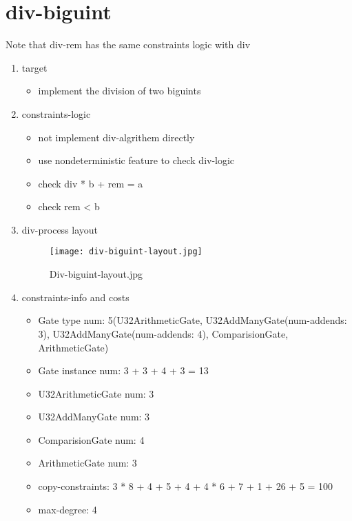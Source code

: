 \section{div-biguint}
\label{div-biguint}

Note that div-rem has the same constraints logic with div

\begin{enumerate}
    \item target
        \begin{itemize}
            \item implement the division of two biguints
        \end{itemize}
    \item constraints-logic
        \begin{itemize}
            \item not implement div-algrithem directly
            \item use nondeterministic feature to check div-logic
            \item check div * b + rem = a
            \item check rem < b
        \end{itemize}
    \item div-process layout
        \begin{figure}[!ht]
            \centering
            \texttt{[image: div-biguint-layout.jpg]}
            \caption{Div-biguint-layout.jpg}
            \label{fig:div-biguint-layout.jpg}
        \end{figure}
    
    \item constraints-info and costs
        \begin{itemize}
            \item Gate type num: 5(U32ArithmeticGate, U32AddManyGate(num-addends: 3), U32AddManyGate(num-addends: 4), ComparisionGate, ArithmeticGate)
            \item Gate instance num: 3 + 3 + 4 + 3 = 13 
            \item U32ArithmeticGate num: 3
            \item U32AddManyGate num: 3
            \item ComparisionGate num: 4
            \item ArithmeticGate num: 3
            \item copy-constraints: 3 * 8 + 4 + 5 + 4 + 4 * 6 + 7 + 1 + 26 + 5 = 100 
            \item max-degree: 4
        \end{itemize}

\end{enumerate}